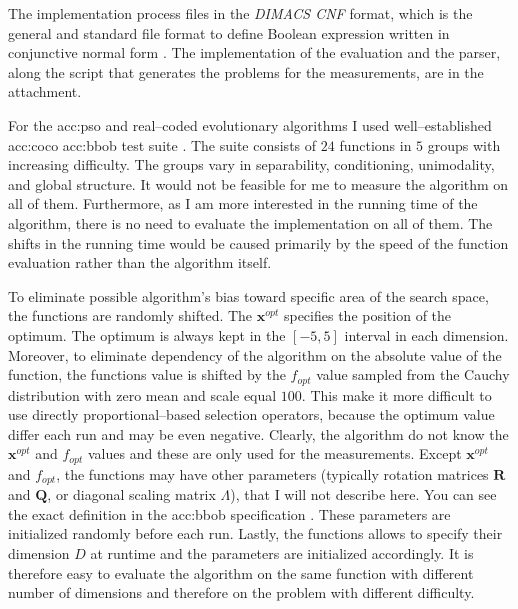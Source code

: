The implementation process files in the \textit{DIMACS CNF} format, which is the general and standard file format to define Boolean expression written in conjunctive normal form \citep{challenge1993satisfiability}. The implementation of the evaluation and the parser, along the script that generates the problems for the measurements, are in the attachment.

For the \acrlong{acc:pso} and real--coded evolutionary algorithms I used well--established \acrfull{acc:coco} \acrfull{acc:bbob} test suite \citep{hansen2010comparing}. The suite consists of $24$ functions in $5$ groups with increasing difficulty. The groups vary in separability, conditioning, unimodality, and global structure. It would not be feasible for me to measure the algorithm on all of them. Furthermore, as I am more interested in the running time of the algorithm, there is no need to evaluate the implementation on all of them. The shifts in the running time would be caused primarily by the speed of the function evaluation rather than the algorithm itself.

To eliminate possible algorithm's bias toward specific area of the search space, the functions are randomly shifted. The $\mathbf{x}^{opt}$ specifies the position of the optimum. The optimum is always kept in the $\left[-5,5\right]$ interval in each dimension. Moreover, to eliminate dependency of the algorithm on the absolute value of the function, the functions value is shifted by the $f_{opt}$ value sampled from the Cauchy distribution with zero mean and scale equal $100$. This make it more difficult to use directly proportional--based selection operators, because the optimum value differ each run and may be even negative. Clearly, the algorithm do not know the $\mathbf{x}^{opt}$ and $f_{opt}$ values and these are only used for the measurements. Except $\mathbf{x}^{opt}$ and $f_{opt}$, the functions may have other parameters (typically rotation matrices $\mathbf{R}$ and $\mathbf{Q}$, or diagonal scaling matrix $\Lambda$), that I will not describe here. You can see the exact definition in the \acrshort{acc:bbob} specification \citep{hansen2010comparing}. These parameters are initialized randomly before each run. Lastly, the functions allows to specify their dimension $D$ at runtime and the parameters are initialized accordingly. It is therefore easy to evaluate the algorithm on the same function with different number of dimensions and therefore on the problem with different difficulty.

